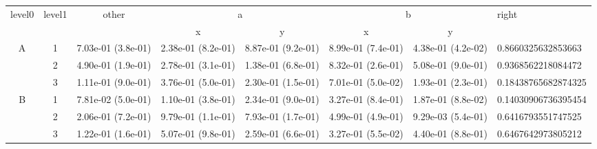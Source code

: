 \begin{tabular}{cccccccl}
\toprule
\multirow{2}{*}{level0} & \multirow{2}{*}{level1}& \multirow{2}{*}{other}&\multicolumn{2}{c}{a}&\multicolumn{2}{c}{b}& \multirow{2}{*}{right}\tabularnewline
\cmidrule(lr){4-5}
\cmidrule(lr){6-7}
&&&x&y&x&y\tabularnewline
\midrule
\multirow{3}{*}{A}&1& 7.03e-01 (3.8e-01)& 2.38e-01 (8.2e-01)& 8.87e-01 (9.2e-01)& 8.99e-01 (7.4e-01)& 4.38e-01 (4.2e-02)& 0.8660325632853663\tabularnewline
&2& 4.90e-01 (1.9e-01)& 2.78e-01 (3.1e-01)& 1.38e-01 (6.8e-01)& 8.32e-01 (2.6e-01)& 5.08e-01 (9.0e-01)& 0.9368562218084472\tabularnewline
&3& 1.11e-01 (9.0e-01)& 3.76e-01 (5.0e-01)& 2.30e-01 (1.5e-01)& 7.01e-01 (5.0e-02)& 1.93e-01 (2.3e-01)& 0.18438765682874325\tabularnewline
\midrule
\multirow{3}{*}{B}&1& 7.81e-02 (5.0e-01)& 1.10e-01 (3.8e-01)& 2.34e-01 (9.0e-01)& 3.27e-01 (8.4e-01)& 1.87e-01 (8.8e-02)& 0.14030906736395454\tabularnewline
&2& 2.06e-01 (7.2e-01)& 9.79e-01 (1.1e-01)& 7.93e-01 (1.7e-01)& 4.99e-01 (4.9e-01)& 9.29e-03 (5.4e-01)& 0.6416793551747525\tabularnewline
&3& 1.22e-01 (1.6e-01)& 5.07e-01 (9.8e-01)& 2.59e-01 (6.6e-01)& 3.27e-01 (5.5e-02)& 4.40e-01 (8.8e-01)& 0.6467642973805212\tabularnewline
\bottomrule
\end{tabular}
